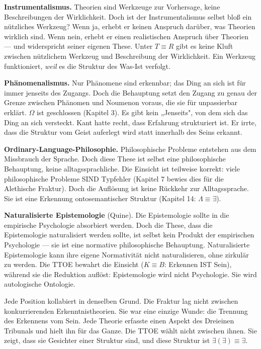 \documentclass[10pt, openany, oneside]{book}
\begin{document}
\textbf{Instrumentalismus.} Theorien sind Werkzeuge zur Vorhersage, keine Beschreibungen der Wirklichkeit. Doch ist der Instrumentalismus selbst bloß ein nützliches Werkzeug? Wenn ja, erhebt er keinen Anspruch darüber, was Theorien wirklich sind. Wenn nein, erhebt er einen realistischen Anspruch über Theorien --- und widerspricht seiner eigenen These. Unter $T \equiv R$ gibt es keine Kluft zwischen nützlichem Werkzeug und Beschreibung der Wirklichkeit. Ein Werkzeug funktioniert, \textit{weil} es die Struktur des Was-Ist verfolgt.

\textbf{Phänomenalismus.} Nur Phänomene sind erkennbar; das Ding an sich ist für immer jenseits des Zugangs. Doch die Behauptung setzt den Zugang zu genau der Grenze zwischen Phänomen und Noumenon voraus, die sie für unpassierbar erklärt. $\Omega$ ist geschlossen (Kapitel 3). Es gibt kein „Jenseits", von dem sich das Ding an sich versteckt. Kant hatte recht, dass Erfahrung strukturiert ist. Er irrte, dass die Struktur vom Geist auferlegt wird statt innerhalb des Seins erkannt.

\textbf{Ordinary-Language-Philosophie.} Philosophische Probleme entstehen aus dem Missbrauch der Sprache. Doch diese These ist selbst eine philosophische Behauptung, keine alltagssprachliche. Die Einsicht ist teilweise korrekt: viele philosophische Probleme SIND Typfehler (Kapitel 7 bewies dies für die Alethische Fraktur). Doch die Auflösung ist keine Rückkehr zur Alltagssprache. Sie ist eine Erkennung ontosemantischer Struktur (Kapitel 14: $\Lambda \equiv \exists$).

\textbf{Naturalisierte Epistemologie} (Quine). Die Epistemologie sollte in die empirische Psychologie absorbiert werden. Doch die These, dass die Epistemologie naturalisiert werden sollte, ist selbst kein Produkt der empirischen Psychologie --- sie ist eine normative philosophische Behauptung. Naturalisierte Epistemologie kann ihre eigene Normativität nicht naturalisieren, ohne zirkulär zu werden. Die TTOE bewahrt die Einsicht ($K \equiv B$: Erkennen IST Sein), während sie die Reduktion auflöst: Epistemologie wird nicht Psychologie. Sie wird autologische Ontologie.

Jede Position kollabiert in denselben Grund. Die Fraktur lag nicht zwischen konkurrierenden Erkenntnistheorien. Sie war eine einzige Wunde: die Trennung des Erkennens vom Sein. Jede Theorie erfasste einen Aspekt des Dreieinen Tribunals und hielt ihn für das Ganze. Die TTOE wählt nicht zwischen ihnen. Sie zeigt, dass sie Gesichter einer Struktur sind, und diese Struktur ist $\exists(\exists) \equiv \exists$.
\end{document}
